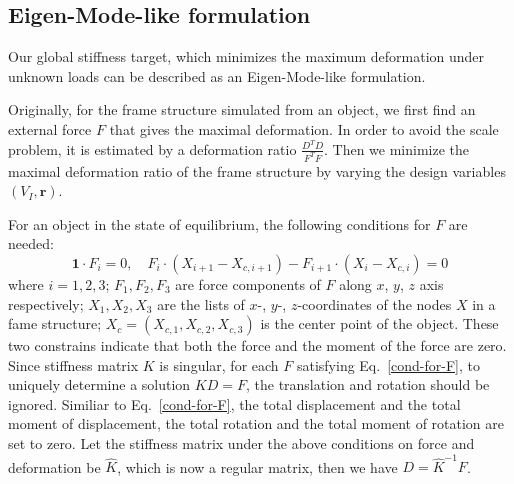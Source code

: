 \subsection{Eigen-Mode-like formulation}
\label{subsec:eigen-mode-opt}

Our global stiffness target, which minimizes the maximum deformation under unknown loads can be described as an Eigen-Mode-like formulation.

Originally, for the frame structure simulated from an object, we first find an external force $F$ that gives the maximal deformation. In order to avoid the scale problem, it is estimated by a deformation ratio $\frac{D^TD}{{F}^T{F}}$.
Then we minimize the maximal deformation ratio of the frame structure by varying the design variables $(V_I, \mathbf{r})$.


For an object in the state of equilibrium, the following conditions for $F$ are needed:
%
\begin{equation}
\label{cond-for-F}
\mathbf{1}\cdot F_i=0, \quad
 F_i \cdot (X_{i+1} -X_{c,i+1})-F_{i+1}\cdot (X_{i} -X_{c,i}) =0
\end{equation}
where $i=1,2,3$; $F_1,F_2,F_3$ are force components of $F$ along $x$, $y$, $z$ axis respectively; $X_1,X_2,X_3$
are the lists of $x$-, $y$-, $z$-coordinates of the nodes $X$ in a fame structure;
$X_{c}=(X_{c,1}, X_{c,2}, X_{c,3})$ is the center point of the object.
%
These two constrains indicate that both the force and the moment of the force are zero.
%
%
%
%
Since stiffness matrix $K$ is singular, for each $F$ satisfying Eq.~\eqref{cond-for-F}, to uniquely determine a solution $K D = F$, the translation and rotation should be ignored. Similiar to Eq.~\eqref{cond-for-F}, the total displacement and the total moment of displacement, the total rotation and the total moment of rotation are set to zero. Let the stiffness matrix under the above conditions on force and deformation be $\hat{K}$, which is now a regular matrix, then we have $D=\hat{K}^{-1}F$.
%

